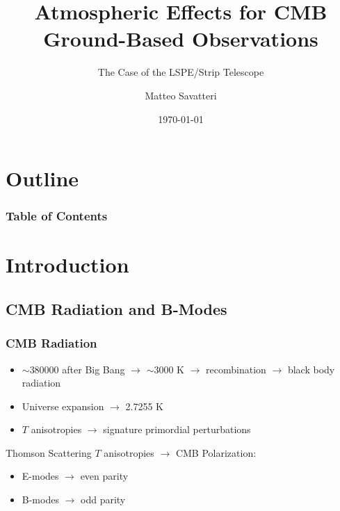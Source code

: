 \documentclass[10pt,aspectratio=169]{beamer}
\title{Atmospheric Effects for CMB Ground-Based Observations}
\subtitle{The Case of the LSPE/Strip Telescope}
\author{Matteo Savatteri}
\institute{Università degli Studi di Milano}
\date{\today}
\begin{document}
\frame{\titlepage}

\section*{Outline}
\begin{frame}
\frametitle{Table of Contents}
\tableofcontents
\end{frame}

\section{Introduction}
\subsection{CMB Radiation and B-Modes}

\begin{frame}
\frametitle{CMB Radiation}

\begin{itemize}
\item $\sim$380000 after Big Bang $\rightarrow$ $\sim$3000 K $\rightarrow$ recombination $\rightarrow$
      black body radiation \pause
\item Universe expansion $\rightarrow$ 2.7255 K \pause
\item $T$ anisotropies $\rightarrow$ signature primordial perturbations \pause
\end{itemize}

\vspace{15pt}

Thomson Scattering $T$ anisotropies $\rightarrow$ CMB Polarization: \pause
\begin{itemize}
\item E-modes $\rightarrow$ even parity \pause
\item B-modes $\rightarrow$ odd parity
\end{itemize}

\pause


\end{frame}
\end{document}

